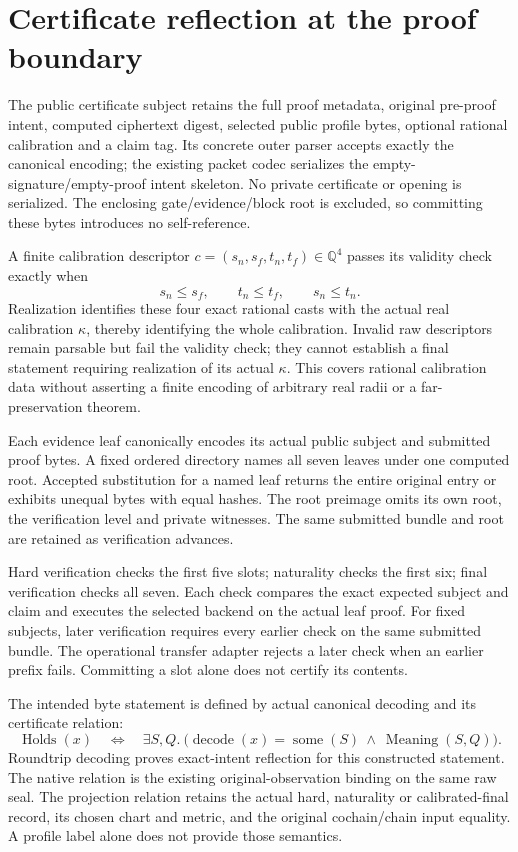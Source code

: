 \section{Certificate reflection at the proof boundary}

The public certificate subject retains the full proof metadata, original
pre-proof intent, computed ciphertext digest, selected public profile bytes,
optional rational calibration and a claim tag. Its concrete outer parser
accepts exactly the canonical encoding; the existing packet codec serializes
the empty-signature/empty-proof intent skeleton. No private certificate or
opening is serialized. The enclosing gate/evidence/block root is excluded,
so committing these bytes introduces no self-reference.

A finite calibration descriptor \(c=(s_n,s_f,t_n,t_f)\in\mathbb Q^4\) passes
its validity check exactly when
\[
 s_n\le s_f,\qquad t_n\le t_f,\qquad s_n\le t_n.
\]
Realization identifies these four exact rational casts with the actual real
calibration \(\kappa\), thereby identifying the whole calibration. Invalid
raw descriptors remain parsable but fail the validity check; they cannot
establish a final statement requiring realization of its actual
\(\kappa\). This covers rational calibration data without asserting a finite
encoding of arbitrary real radii or a far-preservation theorem.

Each evidence leaf canonically encodes its actual public subject and submitted
proof bytes. A fixed ordered directory names all seven leaves under one
computed root. Accepted substitution for a named leaf returns the entire
original entry or exhibits unequal bytes with equal hashes. The root preimage
omits its own root, the verification level and private witnesses. The same
submitted bundle and root are retained as verification advances.

Hard verification checks the first five slots; naturality checks the first
six; final verification checks all seven. Each check compares the exact
expected subject and claim and executes the selected backend on the actual
leaf proof. For fixed subjects, later verification requires every earlier
check on the same submitted bundle. The operational transfer adapter rejects
a later check when an earlier prefix fails. Committing a slot alone does not
certify its contents.

The intended byte statement is defined by actual canonical decoding and its
certificate relation:
\[
 \operatorname{Holds}(x)\quad\Longleftrightarrow\quad
 \exists S,Q.\ \bigl(\operatorname{decode}(x)=\operatorname{some}(S)
     \ \land\ \operatorname{Meaning}(S,Q)\bigr).
\]
Roundtrip decoding proves exact-intent reflection for this constructed
statement. The native relation is the existing original-observation binding
on the same raw seal. The projection relation retains the actual hard,
naturality or calibrated-final record, its chosen chart and metric, and the
original cochain/chain input equality. A profile label alone does not provide
those semantics.

